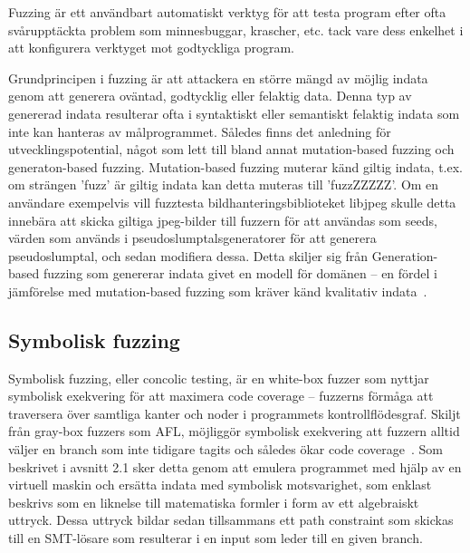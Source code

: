 Fuzzing är ett användbart automatiskt verktyg för att testa program efter ofta
svårupptäckta problem som minnesbuggar, krascher, etc. tack vare dess enkelhet i
att konfigurera verktyget mot godtyckliga program.  

Grundprincipen i fuzzing är att attackera en större mängd av möjlig indata genom
att generera oväntad, godtycklig eller felaktig data. Denna typ av genererad
indata resulterar ofta i syntaktiskt eller semantiskt felaktig indata som inte
kan hanteras av målprogrammet. Således finns det anledning för
utvecklingspotential, något som lett till bland annat mutation-based fuzzing och
generaton-based fuzzing. Mutation-based fuzzing muterar känd giltig indata,
t.ex. om strängen 'fuzz' är giltig indata kan detta muteras till 'fuzzZZZZZ'. Om
en användare exempelvis vill fuzztesta bildhanteringsbiblioteket libjpeg skulle
detta innebära att skicka giltiga jpeg-bilder till fuzzern för att användas som
seeds, värden som används i pseudoslumptalsgeneratorer för att generera
pseudoslumptal, och sedan modifiera dessa. Detta skiljer sig från
Generation-based fuzzing som genererar indata givet en modell för domänen -- en
fördel i jämförelse med mutation-based fuzzing som kräver känd kvalitativ
indata~\cite{fuzzing}. 

\subsection{Symbolisk fuzzing} Symbolisk fuzzing, eller concolic testing, är en
white-box fuzzer som nyttjar symbolisk exekvering för att maximera code coverage
-- fuzzerns förmåga att traversera över samtliga kanter och noder i programmets
kontrollflödesgraf. Skiljt från gray-box fuzzers som AFL, möjliggör symbolisk
exekvering att fuzzern alltid väljer en branch som inte tidigare tagits och
således ökar code coverage~\cite{challenges_fuzzing}. Som beskrivet i avsnitt
2.1 sker detta genom att emulera programmet med hjälp av en virtuell maskin och
ersätta indata med symbolisk motsvarighet, som enklast beskrivs som en liknelse
till matematiska formler i form av ett algebraiskt uttryck. Dessa uttryck bildar
sedan tillsammans ett path constraint som skickas till en SMT-lösare som
resulterar i en input som leder till en given branch. 

